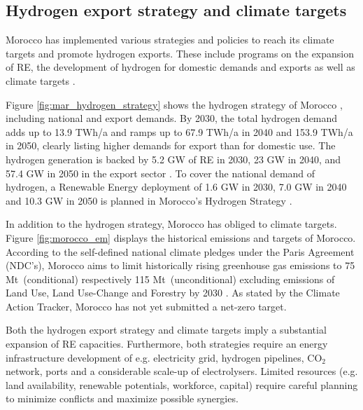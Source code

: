 \subsection*{Hydrogen export strategy and climate targets}

Morocco has implemented various strategies and policies to reach its climate targets and promote hydrogen exports. These include programs on the expansion of RE, the development of hydrogen for domestic demands and exports as well as climate targets \cite{MarHyStrat2021, CAT2021}.

Figure \ref{fig:mar_hydrogen_strategy} shows the hydrogen strategy of Morocco \cite{MarHyStrat2021}, including national and export demands.
By 2030, the total hydrogen demand adds up to 13.9 TWh/a and ramps up to 67.9 TWh/a in 2040 and 153.9 TWh/a in 2050, 
clearly listing higher demands for export than for domestic use. The hydrogen generation is backed by 5.2 GW of RE in 2030, 23 GW in 2040, and 57.4 GW in 2050 in the export sector \cite{MarHyStrat2021}. To cover the national demand of hydrogen, a Renewable Energy deployment of 1.6 GW in 2030, 7.0 GW in 2040 and 10.3 GW in 2050 is planned in Morocco's Hydrogen Strategy \cite{MarHyStrat2021}.


In addition to the hydrogen strategy, Morocco has obliged to climate targets. Figure \ref{fig:morocco_em} displays the historical emissions and targets of Morocco.
According to the self-defined national climate pledges under the Paris Agreement (NDC's), Morocco aims to limit historically rising greenhouse gas emissions to 75 Mt\coe\ (conditional) respectively 115 Mt\coe\ (unconditional) excluding emissions of Land Use, Land Use-Change and Forestry by 2030 \cite{CAT2021}. 
As stated by the Climate Action Tracker\cite{CAT2021}, Morocco has not yet submitted a net-zero target. 


Both the hydrogen export strategy and climate targets imply a substantial expansion of RE capacities. Furthermore, both strategies require an energy infrastructure development of e.g. electricity grid, hydrogen pipelines, $\mathrm{CO_2}$ network, ports and a considerable scale-up of electrolysers.
Limited resources (e.g. land availability, renewable potentials, workforce, capital) require careful planning to minimize conflicts and maximize possible synergies.

